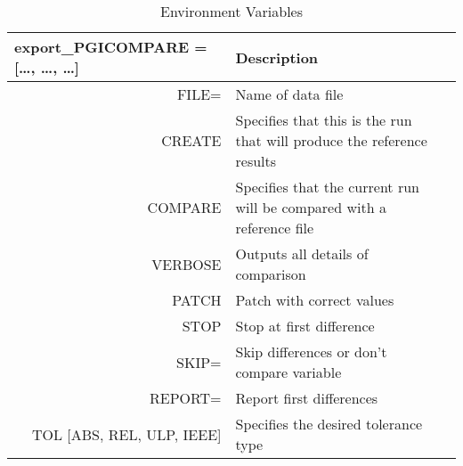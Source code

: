 \documentclass{llncs}
\begin{document}
\begin{table}
\caption{Environment Variables }
\begin{center}
\begin{tabular}{r@{\quad}ll}
\hline
\multicolumn{1}{l}{\rule{0pt}{12pt} export\_PGICOMPARE = […, …, …] 
}&\multicolumn{2}{l}{  Description }\\[2pt]
\hline\rule{0pt}{12pt}
FILE= & Name of data file & \\
CREATE   &   Specifies that this is the run that will produce the reference results& \\
COMPARE   &   Specifies that the current run will be compared with a reference file& \\
VERBOSE   & Outputs all details of comparison& \\
PATCH   &   Patch with correct values& \\
STOP   &   Stop at first difference & \\
SKIP=    & Skip differences or don’t compare variable & \\
REPORT=    & Report first differences & \\
TOL [ABS, REL, ULP, IEEE]  & Specifies the desired tolerance type &\\[2pt]
\hline
\end{tabular}
\end{center}
\end{table}




\end{document}
